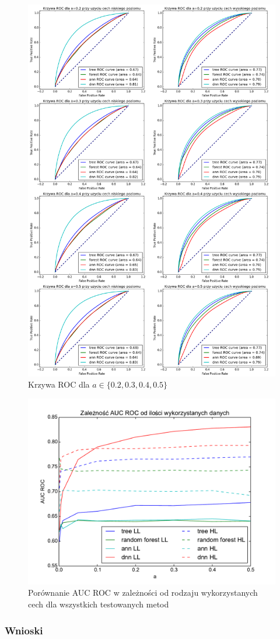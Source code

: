 \begin{figure}[ht!]
\centering
\includegraphics[scale=0.3]{res/all2.png}
\caption[Caption for LOF]{Krzywa ROC dla $a\in\{0.2, 0.3, 0.4, 0.5\}$\label{higgsall2}}
\end{figure} 

\begin{figure}[ht!]
\centering
\includegraphics[scale=0.8]{res/higgssummary.pdf}
\caption[Caption for LOF]{Porównanie AUC ROC w zależności od rodzaju wykorzystanych cech dla wszystkich testowanych metod\label{higgssummary}}
\end{figure} 

\subsubsection{Wnioski}


